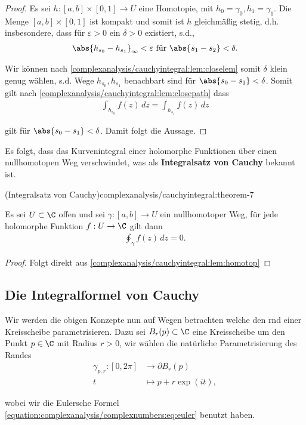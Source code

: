 \documentclass[letterpaper,10pt,german]{jupyterBook}
\begin{document}
\begin{proof}
 Es sei \(h:[a,b]\times[0,1]\to U\) eine Homotopie, mit \(h_0=\gamma_0, h_1=\gamma_1\). Die Menge \([a,b]\times[0,1]\) ist kompakt und somit ist \(h\) gleichmäßig stetig, d.h. insbesondere, dass für \(\varepsilon>0\) ein \(\delta >0\) existiert, s.d.,
\begin{align*}
\abs{h_{s_0}-h_{s_1}}_\infty <\varepsilon \text{ für } \abs{s_1-s_2}< \delta.
\end{align*}
\par
Wir können nach \cref{complexanalysis/cauchyintegral:lem:closelem} somit \(\delta\) klein genug wählen, s.d. Wege \(h_{s_0}, h_{s_1}\) benachbart sind für \(\abs{s_0-s_1}<\delta\). Somit gilt nach \cref{complexanalysis/cauchyintegral:lem:closepath}  dass
\begin{align*}
\int_{h_{s_0}} f(z)\, dz = \int_{h_{s_1}} f(z)\, dz
\end{align*}
\par
gilt für \(\abs{s_0-s_1}<\delta\). Damit folgt die Aussage.
\end{proof}

\par
Es folgt, dass das Kurvenintegral einer holomorphe Funktionen über einen nullhomotopen Weg verschwindet, was als \textbf{Integralsatz von Cauchy} bekannt ist.
\begin{theorem}{(Integralsatz von Cauchy)}{complexanalysis/cauchyintegral:theorem-7}



\par
Es sei \(U\subset\C\) offen und sei \(\gamma:[a,b]\to U\) ein nullhomotoper Weg, für jede holomorphe Funktion \(f:U\to\C\) gilt dann
\begin{align*}
\oint_\gamma f(z)\, dz = 0.
\end{align*}\end{theorem}

\begin{proof}
 Folgt direkt aus \cref{complexanalysis/cauchyintegral:lem:homotop} 
\end{proof}


\subsection{Die Integralformel von Cauchy}
\label{\detokenize{complexanalysis/cauchyintegral:die-integralformel-von-cauchy}}
\par
Wir werden die obigen Konzepte nun auf Wegen betrachten welche den rnd einer Kreisscheibe parametrisieren. Dazu sei \(B_r(p)\subset\C\) eine Kreisscheibe um den Punkt \(p\in\C\) mit Radius \(r>0\), wir wählen die natürliche Parametrisierung des Randes
\begin{align*}
\gamma_{p,r}:[0,2\pi]&\to \partial B_r(p)\\
t&\mapsto p + r\exp(i t),
\end{align*}
\par
wobei wir die Eulersche Formel \eqref{equation:complexanalysis/complexnumbers:eq:euler} benutzt haben.
\end{document}
